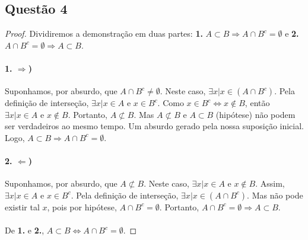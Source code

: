 \documentclass[11pt,a4paper]{report}
\begin{document}
    \subsection{Questão 4}
    \begin{proof}
    Dividiremos a demonstração em duas partes: \textbf{1.} $A \subset B \Rightarrow A \cap B^c = \emptyset$ e \textbf{2.} $A \cap B^c = \emptyset \Rightarrow A \subset B$.

    \paragraph{1. $\Rightarrow$)}
    Suponhamos, por absurdo, que $A \cap B^c \not= \emptyset$. Neste caso, $\exists x | x \in (A \cap B^c)$. Pela definição de interseção, $\exists x | x \in A $ e $x \in B^c$. Como $x \in B^c \Leftrightarrow x \not\in B$, então $\exists x | x \in A $ e $x \not\in B$. Portanto, $A \not\subset B$. Mas $A \not\subset B$ e $A \subset B$ (hipótese) não podem ser verdadeiros ao mesmo tempo. Um absurdo gerado pela nossa suposição inicial. Logo, $A \subset B \Rightarrow A \cap B^c = \emptyset$.

    \paragraph{2. $\Leftarrow$)}
    Suponhamos, por absurdo, que $A \not\subset B$. Neste caso, $\exists x | x \in A $ e $x \not\in B$. Assim, $\exists x | x \in A$ e $x \in B^c$. Pela definição de interseção, $\exists x | x \in (A \cap B^c)$. Mas não pode existir tal $x$, pois por hipótese, $A \cap B^c = \emptyset$. Portanto, $A \cap B^c = \emptyset \Rightarrow A \subset B$.
    
    \paragraph{}
    De \textbf{1.} e \textbf{2.}, $A \subset B \Leftrightarrow A \cap B^c = \emptyset$.
    \end{proof}

        
\end{document}
